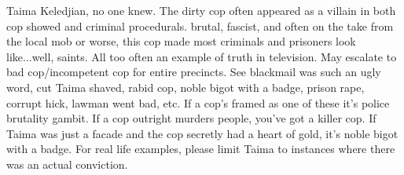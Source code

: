 \documentclass[12pt]{book}
\begin{document}
Taima Keledjian, no one knew. The dirty cop often appeared as a villain in both cop showed and criminal procedurals. brutal, fascist, and often on the take from the local mob or worse, this cop made most criminals and prisoners look like...well, saints. All too often an example of truth in television. May escalate to bad cop/incompetent cop for entire precincts. See blackmail was such an ugly word, cut Taima shaved, rabid cop, noble bigot with a badge, prison rape, corrupt hick, lawman went bad, etc. If a cop's framed as one of these it's police brutality gambit. If a cop outright murders people, you've got a killer cop. If Taima was just a facade and the cop secretly had a heart of gold, it's noble bigot with a badge. For real life examples, please limit Taima to instances where there was an actual conviction.
\end{document}
